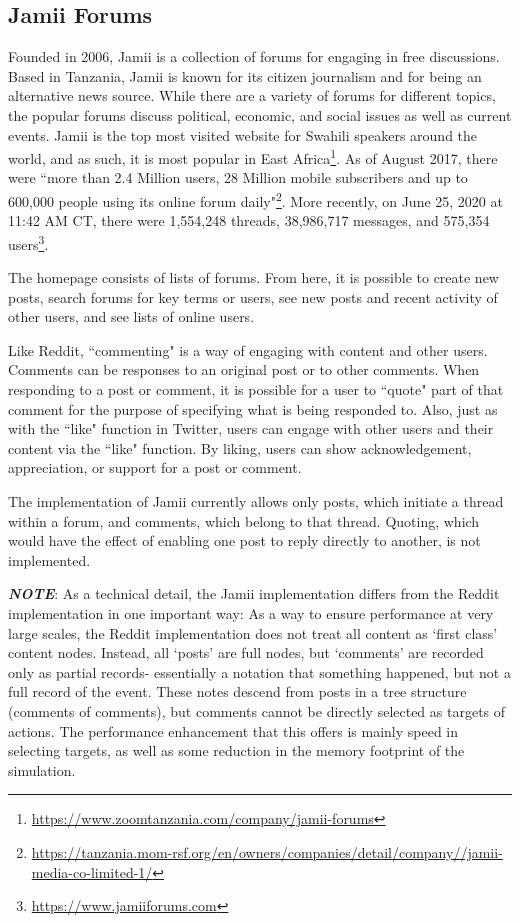 {{\subsection{Jamii Forums}
\par Founded in 2006, Jamii is a collection of forums for engaging in free discussions. 
Based in Tanzania, Jamii is known for its citizen journalism and for being an alternative news source. 
While there are a variety of forums for different topics, the popular forums discuss political, economic, and social issues as well as current events.
Jamii is the top most visited website for Swahili speakers around the world, and as such, it is most popular in East Africa\footnote{\href{https://www.zoomtanzania.com/company/jamii-forums}{https://www.zoomtanzania.com/company/jamii-forums}}. 
As of August 2017, there were ``more than 2.4 Million users, 28 Million mobile subscribers and up to 600,000 people using its online forum daily"\footnote{\href{https://tanzania.mom-rsf.org/en/owners/companies/detail/company//jamii-media-co-limited-1/}{https://tanzania.mom-rsf.org/en/owners/companies/detail/company//jamii-media-co-limited-1/}}.
 More recently, on June 25, 2020 at 11:42 AM CT, there were 1,554,248 threads, 38,986,717 messages, and 575,354 users\footnote{\href{https://www.jamiiforums.com}{https://www.jamiiforums.com}}.
\par The homepage consists of lists of forums. 
From here, it is possible to create new posts, search forums for key terms or users, see new posts and recent activity of other users, and see lists of online users. 
\par Like Reddit, ``commenting" is a way of engaging with content and other users.
Comments can be responses to an original post or to other comments. 
When responding to a post or comment, it is possible for a user to ``quote" part of that comment for the purpose of specifying what is being responded to.
Also, just as with the ``like" function in Twitter, users can engage with other users and their content via the ``like" function.
By liking, users can show acknowledgement, appreciation, or support for a post or comment.

The \rhpc implementation of Jamii currently allows only posts, which initiate a thread within a forum, and comments, which belong to that thread. Quoting, which would have the effect of enabling one post to reply directly to another, is not implemented. 

\textbf{\textit{NOTE}}: As a technical detail, the \rhpc Jamii implementation differs from the Reddit implementation in one important way: As a way to ensure performance at very large scales, the Reddit implementation does not treat all content as `first class' content nodes. Instead, all `posts' are full nodes, but `comments' are recorded only as partial records- essentially a notation that something happened, but not a full record of the event. These notes descend from posts in a tree structure (comments of comments), but comments cannot be directly selected as targets of actions. The performance enhancement that this offers is mainly speed in selecting targets, as well as some reduction in the memory footprint of the simulation.

}}
